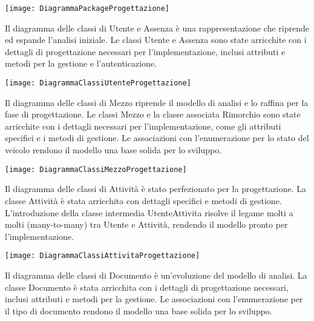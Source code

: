 \documentclass[a4paper]{report}
\begin{document}
\begin{figure*}[!ht]
    \centering
    \texttt{[image: DiagrammaPackageProgettazione]}
\end{figure*}

\clearpage
{}

Il diagramma delle classi di Utente e Assenza è una rappresentazione che riprende ed espande l'analisi iniziale. Le classi Utente e Assenza sono state arricchite con i dettagli di progettazione necessari per l'implementazione, inclusi attributi e metodi per la gestione e l'autenticazione.

\begin{figure*}[!ht]
    \centering
    \texttt{[image: DiagrammaClassiUtenteProgettazione]}
\end{figure*}

\clearpage
{}

Il diagramma delle classi di Mezzo riprende il modello di analisi e lo raffina per la fase di progettazione. Le classi Mezzo e la classe associata Rimorchio sono state arricchite con i dettagli necessari per l'implementazione, come gli attributi specifici e i metodi di gestione. Le associazioni con l'enumerazione per lo stato del veicolo rendono il modello una base solida per lo sviluppo.

\begin{figure*}[!ht]
    \centering
    \texttt{[image: DiagrammaClassiMezzoProgettazione]}
\end{figure*}

\clearpage
{}

Il diagramma delle classi di Attività è stato perfezionato per la progettazione. La classe Attività è stata arricchita con dettagli specifici e metodi di gestione. L'introduzione della classe intermedia UtenteAttivita risolve il legame molti a molti (many-to-many) tra Utente e Attività, rendendo il modello pronto per l'implementazione.

\begin{figure*}[!ht]
    \centering
    \texttt{[image: DiagrammaClassiAttivitaProgettazione]}
\end{figure*}

\clearpage
{}
Il diagramma delle classi di Documento è un'evoluzione del modello di analisi. La classe Documento è stata arricchita con i dettagli di progettazione necessari, inclusi attributi e metodi per la gestione. Le associazioni con l'enumerazione per il tipo di documento rendono il modello una base solida per lo sviluppo.
\end{document}
